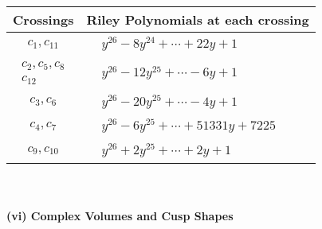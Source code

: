 \documentclass[1p]{elsarticle_modified}
\theoremstyle{definition}
\begin{document}
\begin{tabular}{m{50pt}|m{274pt}}
Crossings & \hspace{64pt}Riley Polynomials at each crossing \\
\hline $$\begin{aligned}c_{1},c_{11}\end{aligned}$$&$\begin{aligned}
&y^{26}-8 y^{24}+\cdots+22 y+1
\end{aligned}$\\
\hline $$\begin{aligned}c_{2},c_{5},c_{8}\\c_{12}\end{aligned}$$&$\begin{aligned}
&y^{26}-12 y^{25}+\cdots-6 y+1
\end{aligned}$\\
\hline $$\begin{aligned}c_{3},c_{6}\end{aligned}$$&$\begin{aligned}
&y^{26}-20 y^{25}+\cdots-4 y+1
\end{aligned}$\\
\hline $$\begin{aligned}c_{4},c_{7}\end{aligned}$$&$\begin{aligned}
&y^{26}-6 y^{25}+\cdots+51331 y+7225
\end{aligned}$\\
\hline $$\begin{aligned}c_{9},c_{10}\end{aligned}$$&$\begin{aligned}
&y^{26}+2 y^{25}+\cdots+2 y+1
\end{aligned}$\\
\hline
\end{tabular}\\~\\
\newpage\flushleft \textbf{(vi) Complex Volumes and Cusp Shapes}
\end{document}

